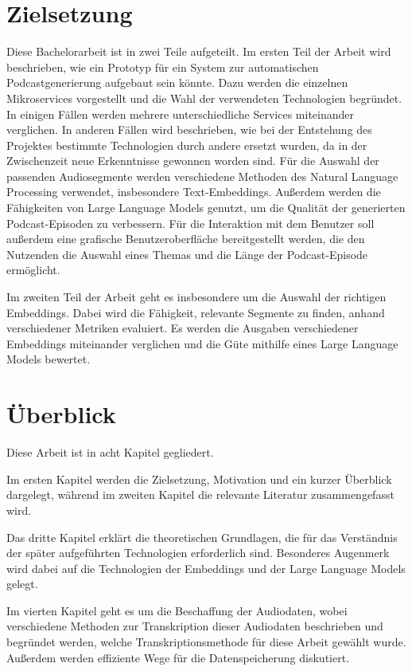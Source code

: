 \section{Zielsetzung}

Diese Bachelorarbeit ist in zwei Teile aufgeteilt.
Im ersten Teil der Arbeit wird beschrieben, wie ein Prototyp für ein System zur automatischen Podcastgenerierung aufgebaut sein könnte.
Dazu werden die einzelnen Mikroservices vorgestellt und die Wahl der verwendeten Technologien begründet.
In einigen Fällen werden mehrere unterschiedliche Services miteinander verglichen.
In anderen Fällen wird beschrieben, wie bei der Entstehung des Projektes bestimmte Technologien durch andere ersetzt wurden, da in der Zwischenzeit neue Erkenntnisse gewonnen worden sind.
Für die Auswahl der passenden Audiosegmente werden verschiedene Methoden des Natural Language Processing verwendet, insbesondere Text-Embeddings.
Außerdem werden die Fähigkeiten von Large Language Models genutzt, um die Qualität der generierten Podcast-Episoden zu verbessern.
Für die Interaktion mit dem Benutzer soll außerdem eine grafische Benutzeroberfläche bereitgestellt werden, die den Nutzenden die Auswahl eines Themas und die Länge der Podcast-Episode ermöglicht.

Im zweiten Teil der Arbeit geht es insbesondere um die Auswahl der richtigen Embeddings.
Dabei wird die Fähigkeit, relevante Segmente zu finden, anhand verschiedener Metriken evaluiert.
Es werden die Ausgaben verschiedener Embeddings miteinander verglichen und die Güte mithilfe eines Large Language Models bewertet.

\section{Überblick}

Diese Arbeit ist in acht Kapitel gegliedert.

Im ersten Kapitel werden die Zielsetzung, Motivation und ein kurzer Überblick dargelegt, während im zweiten Kapitel die relevante Literatur zusammengefasst wird.

Das dritte Kapitel erklärt die theoretischen Grundlagen, die für das Verständnis der später aufgeführten Technologien erforderlich sind. 
Besonderes Augenmerk wird dabei auf die Technologien der Embeddings und der Large Language Models gelegt.

Im vierten Kapitel geht es um die Beschaffung der Audiodaten, wobei verschiedene Methoden zur Transkription dieser Audiodaten beschrieben und begründet werden, welche Transkriptionsmethode für diese Arbeit gewählt wurde. 
Außerdem werden effiziente Wege für die Datenspeicherung diskutiert.


